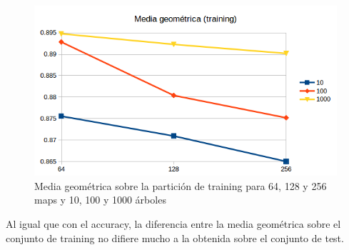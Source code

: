 \begin{figure}[H]
	\centering
	\includegraphics[width=12cm]{img/media-geometrica-training}
	\caption{Media geométrica sobre la partición de training para 64, 128 y 256 maps y 10, 100 y 1000 árboles}
	\label{fig:media-geometrica-training}
\end{figure}

Al igual que con el accuracy, la diferencia entre la media geométrica sobre el conjunto de training no difiere mucho a la obtenida sobre el conjunto de test.




